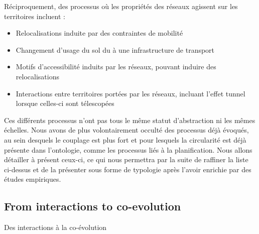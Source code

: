 Réciproquement, des processus où les propriétés des réseaux agissent sur les territoires incluent :
\begin{itemize}
	\item Relocalisations induite par des contraintes de mobilité
	\item Changement d'usage du sol du à une infrastructure de transport
    \item Motifs d'accessibilité induits par les réseaux, pouvant induire des relocalisations
	\item Interactions entre territoires portées par les réseaux, incluant l'effet tunnel lorsque celles-ci sont télescopées
	
	
\end{itemize}

Ces différents processus n'ont pas tous le même statut d'abstraction ni les mêmes échelles. Nous avons de plus volontairement occulté des processus déjà évoqués, au sein desquels le couplage est plus fort et pour lesquels la circularité est déjà présente dans l'ontologie, comme les processus liés à la planification. Nous allons détailler à présent ceux-ci, ce qui nous permettra par la suite de raffiner la liste ci-dessus et de la présenter sous forme de typologie après l'avoir enrichie par des études empiriques.



\subsection{From interactions to co-evolution}{Des interactions à la co-évolution}


